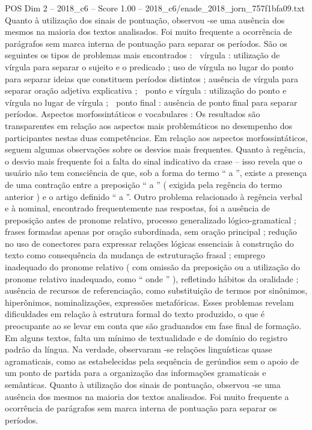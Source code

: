 \begin{textsample}{POS Dim 2 – 2018\_c6 – Score 1.00 – 2018\_c6/enade\_2018\_jorn\_757f1bfa09.txt}
Quanto à utilização dos sinais de pontuação, observou -se uma ausência dos mesmos na maioria dos textos analisados.
Foi muito frequente a ocorrência de parágrafos sem marca interna de pontuação para separar os períodos.
São os seguintes os tipos de problemas mais encontrados :  vírgula : utilização de vírgula para separar o sujeito e o predicado ; uso de vírgula no lugar do ponto para separar ideias que constituem períodos distintos ; ausência de vírgula para separar oração adjetiva explicativa ;  ponto e vírgula : utilização do ponto e vírgula no lugar de vírgula ;  ponto final : ausência de ponto final para separar períodos.
Aspectos morfossintáticos e vocabulares : Os resultados são transparentes em relação aos aspectos mais problemáticos no desempenho dos participantes nestas duas competências.
Em relação aos aspectos morfossintáticos, seguem algumas observações sobre os desvios mais frequentes.
Quanto à regência, o desvio mais frequente foi a falta do sinal indicativo da crase – isso revela que o usuário não tem consciência de que, sob a forma do termo “ a ”, existe a presença de uma contração entre a preposição “ a ” ( exigida pela regência do termo anterior ) e o artigo definido “ a ”.
Outro problema relacionado à regência verbal e à nominal, encontrado frequentemente nas respostas, foi a ausência de preposição antes de pronome relativo, processo generalizado lógico-gramatical ; frases formadas apenas por oração subordinada, sem oração principal ; redução no uso de conectores para expressar relações lógicas essenciais à construção do texto como consequência da mudança de estruturação frasal ; emprego inadequado do pronome relativo ( com omissão da preposição ou a utilização do pronome relativo inadequado, como “ onde ” ), refletindo hábitos da oralidade ; ausência de recursos de referenciação, como substituição de termos por sinônimos, hiperônimos, nominalizações, expressões metafóricas.
Esses problemas revelam dificuldades em relação à estrutura formal do texto produzido, o que é preocupante ao se levar em conta que são graduandos em fase final de formação.
Em alguns textos, falta um mínimo de textualidade e de domínio do registro padrão da língua.
Na verdade, observaram -se relações linguísticas quase agramaticais, como as estabelecidas pela sequência de gerúndios sem o apoio de um ponto de partida para a organização das informações gramaticais e semânticas.
Quanto à utilização dos sinais de pontuação, observou -se uma ausência dos mesmos na maioria dos textos analisados.
Foi muito frequente a ocorrência de parágrafos sem marca interna de pontuação para separar os períodos.

\end{textsample}
